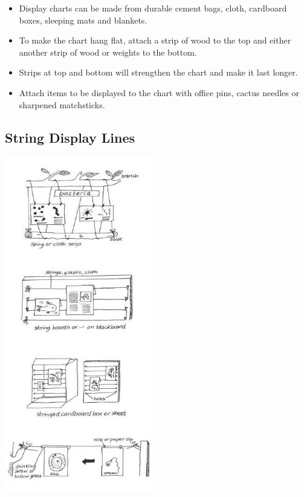 \begin{multicols}{2}
\begin{itemize}
\item Display charts can be made
from durable cement bags,
cloth, cardboard boxes, sleeping
mats and blankets.
\item To make the chart hang flat,
attach a strip of wood to the
top and either another strip of
wood or weights to the bottom.
\item Strips at top and bottom will
strengthen the chart and make
it last longer.
\item Attach items to be displayed to
the chart with office pins, cactus
needles or sharpened
matchsticks.
\end{itemize}

%

\subsection{String Display Lines}

\begin{center}
\includegraphics[width=0.49\textwidth]{./img/vso/string-display.jpg}
\end{center}


\end{multicols}
